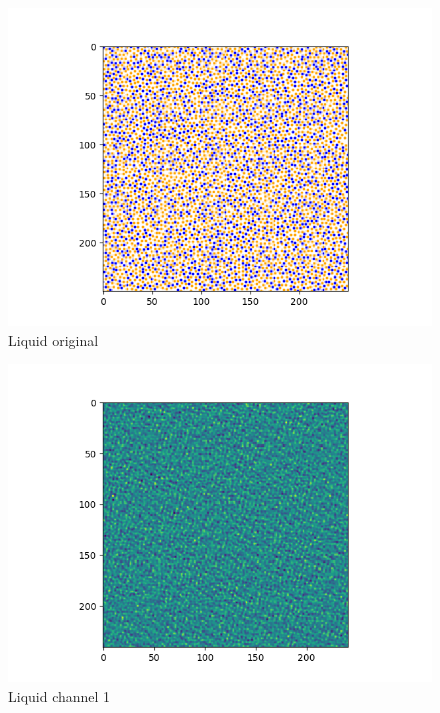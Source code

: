 \documentclass[12pt,reqno]{amsart}
\numberwithin{equation}{section}
\begin{document}
\begin{enumerate}
\begin{figure}[H]
\centering
\includegraphics[scale=0.6]{liquid_original}
\caption{Liquid original}
\end{figure}

\begin{figure}[H]
\centering
\includegraphics[scale=0.6]{liquid_channel_1}
\caption{Liquid channel 1}
\end{figure}


\end{enumerate}
\end{document}
